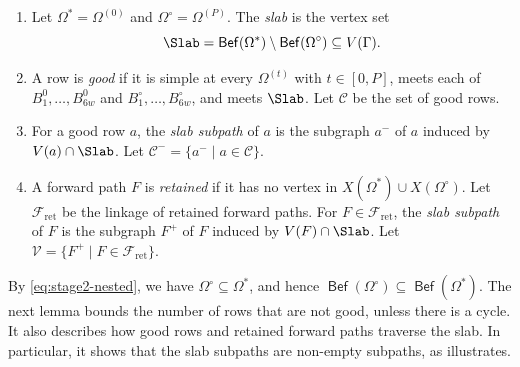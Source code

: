 \documentclass[fontsize=12pt,leading=14pt]{fullpaper}
\DeclareMathOperator{\Bef}{\mathsf{Bef}}
\newcommand{\Ccal}{\mathcal{C}}
\newcommand{\Fcal}{\mathcal{F}}
\newcommand{\Vcal}{\mathcal{V}}
\begin{document}
\begin{definition}\label{def:slab}
  \leavevmode
  \begin{enumerate}[label=\textnormal{(\roman*)}]
    \item Let $\Omega^*=\Omega^{(0)}$ and $\Omega^\circ=\Omega^{(P)}$.
      The \emph{slab} is the vertex set
      \[
        \Slab=\Bef(\Omega^*)\setminus\Bef(\Omega^\circ)\subseteq V(\Gamma).
      \]
    \item A row is \emph{good} if it is simple at every $\Omega^{(t)}$ with $t\in[0,P]$, meets each of $B^0_1,\dots,B^0_{6w}$ and $B^\circ_1,\dots,B^\circ_{6w}$, and meets $\Slab$.
      Let $\Ccal$ be the set of good rows.
    \item For a good row $a$, the \emph{slab subpath} of $a$ is the subgraph $a^-$ of $a$ induced by $V(a)\cap\Slab$.
      Let $\Ccal^-=\{a^-\mid a\in\Ccal\}$.
    \item A forward path $F$ is \emph{retained} if it has no vertex in $X(\Omega^*)\cup X(\Omega^\circ)$.
      Let $\Fcal_{\mathrm{ret}}$ be the linkage of retained forward paths.
      For $F\in\Fcal_{\mathrm{ret}}$, the \emph{slab subpath} of $F$ is the subgraph $F^+$ of $F$ induced by $V(F)\cap\Slab$.
      Let $\Vcal=\{F^+\mid F\in\Fcal_{\mathrm{ret}}\}$.
  \end{enumerate}
\end{definition}

By \eqref{eq:stage2-nested}, we have $\Omega^\circ\subseteq\Omega^*$, and hence $\Bef(\Omega^\circ)\subseteq\Bef(\Omega^*)$.
The next lemma bounds the number of rows that are not good, unless there is a cycle.
It also describes how good rows and retained forward paths traverse the slab.
In particular, it shows that the slab subpaths are non-empty subpaths, as  illustrates.
\end{document}
